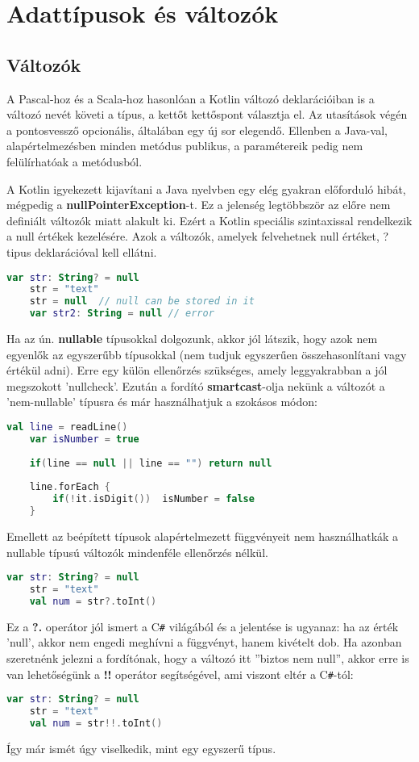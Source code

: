 \section{Adattípusok és változók}
\label{sec:types}

\subsection{Változók}
\label{subsec:k_var}

A Pascal-hoz és a Scala-hoz hasonlóan a Kotlin változó deklarációiban is a változó nevét követi a típus, a kettőt kettőspont választja el. Az utasítások végén a pontosvessző opcionális, általában egy új sor elegendő. Ellenben a Java-val, alapértelmezésben minden metódus publikus, a paramétereik pedig nem felülírhatóak a metódusból.

A Kotlin igyekezett kijavítani a Java nyelvben egy elég gyakran előforduló hibát, mégpedig a \textbf{nullPointerException}-t. Ez a jelenség legtöbbször az előre nem definiált változók miatt alakult ki. Ezért a Kotlin speciális szintaxissal rendelkezik a null értékek kezelésére. Azok a változók, amelyek felvehetnek null értéket, ? tipus deklarációval kell ellátni. 
\scriptsize
\begin{lstlisting}[language = Kotlin]
	var str: String? = null
	str = "text"
	str = null  // null can be stored in it
	var str2: String = null // error
\end{lstlisting}
\normalsize
\newpage
Ha az ún. \textbf{nullable} típusokkal dolgozunk, akkor jól látszik, hogy azok nem egyenlők az egyszerűbb típusokkal (nem tudjuk egyszerűen összehasonlítani vagy értékül adni). Erre egy külön ellenőrzés szükséges, amely leggyakrabban a jól megszokott 'nullcheck'. Ezután a fordító \textbf{smartcast}-olja nekünk a változót a 'nem-nullable' típusra és már használhatjuk a szokásos módon:
\scriptsize
\begin{lstlisting}[language = Kotlin]
	val line = readLine()
	var isNumber = true
	
	if(line == null || line == "") return null
	
	line.forEach {
		if(!it.isDigit())  isNumber = false
	}
\end{lstlisting}
\normalsize
Emellett az beépített típusok alapértelmezett függvényeit nem használhatkák a nullable típusú változók mindenféle ellenőrzés nélkül.
\scriptsize
\begin{lstlisting}[language = Kotlin]
	var str: String? = null
	str = "text"
	val num = str?.toInt()
\end{lstlisting}
\normalsize
Ez a \textbf{?.} operátor jól ismert a C\verb|#| világából és a jelentése is ugyanaz: ha az érték 'null', akkor nem engedi meghívni a függvényt, hanem kivételt dob. Ha azonban szeretnénk jelezni a fordítónak, hogy a változó itt ''biztos nem null'', akkor erre is van lehetőségünk a \textbf{!!} operátor segítségével, ami viszont eltér a C\verb|#|-tól:
\scriptsize
\begin{lstlisting}[language = Kotlin]
	var str: String? = null
	str = "text"
	val num = str!!.toInt()
\end{lstlisting}
\normalsize
Így már ismét úgy viselkedik, mint egy egyszerű típus.

